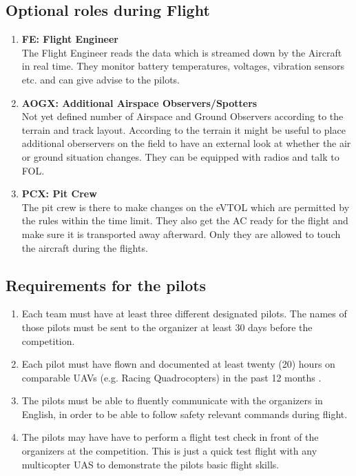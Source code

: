     \subsection{Optional roles during Flight}
    \begin{enumerate}
      \item \textbf{FE: Flight Engineer}\\The Flight Engineer reads the data which is streamed down by the Aircraft in real time. They monitor battery temperatures, voltages, vibration sensors etc. and can give advise to the pilots.
      \item \textbf{AOGX: Additional Airspace Observers/Spotters}\\Not yet defined number of Airspace and Ground Observers according to the terrain and track layout.
      According to the terrain it might be useful to place additional oberservers on the field to have an external look at whether the air or ground situation changes. They can be equipped with radios and talk to FOL.
      \item \textbf{PCX: Pit Crew }\\The pit crew is there to make changes on the eVTOL which are permitted by the rules within the time limit. They also get the AC ready for the flight and make sure it is transported away afterward. Only they are allowed to touch the aircraft during the flights. 
    \end{enumerate}

    \subsection{Requirements for the pilots}
    \begin{enumerate}
      \item Each team must have at least three different designated pilots. The names of those pilots must be sent to the organizer at least 
      30 days before the competition. 
      \item Each pilot must have flown and documented at least twenty (20) hours on comparable UAVs (e.g. Racing Quadrocopters) in the past 12 months \label{SubSec:PilotRequirements}.  
      \item The pilots must be able to fluently communicate with the organizers in English, in order to be able to follow safety relevant commands during flight.
      \item The pilots may have have to perform a flight test check in front of the organizers at the competition. This is just a quick test flight with any multicopter UAS to demonstrate the pilots basic flight skills.
    \end{enumerate}

